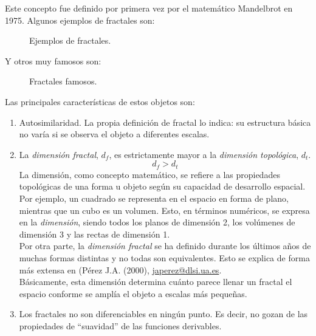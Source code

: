 \documentclass[a4paper, openright, 11pt, titlepage]{report}
\theoremstyle{definition}\newtheorem{defin}[propo]{Definition}
\theoremstyle{definition}\newtheorem{obser}[propo]{Remark}
\theoremstyle{definition}\newtheorem{ejem}[propo]{Ejemplo}
\theoremstyle{definition}\newtheorem{algoritmo}[propo]{Algoritmo}
\begin{document}
\begin{itemize}
    Este concepto fue definido por primera vez por el matemático Mandelbrot en 1975. Algunos ejemplos de fractales son:
    \begin{figure}[H]
        \centering
         \hspace{1.7cm}
        \caption{Ejemplos de fractales.}
    \end{figure}
    Y otros muy famosos son:
    \begin{figure}[H]
        \centering
         \hspace{1.7cm}
        \caption{Fractales famosos.}
    \end{figure}
    Las principales características de estos objetos son:
    \begin{enumerate}
        \item Autosimilaridad. La propia definición de fractal lo indica: su estructura básica no varía si se observa el objeto a diferentes escalas.
        \item La \textit{dimensión fractal}, $d_{f}$, es estrictamente mayor a la \textit{dimensión topológica}, $d_{t}$.
        $$d_{f} > d_{t}$$
        La dimensión, como concepto matemático, se refiere a las propiedades topológicas de una forma u objeto según su capacidad de desarrollo espacial. Por ejemplo, un cuadrado se representa en el espacio en forma de plano, mientras que un cubo es un volumen. Esto, en términos numéricos, se expresa en la \textit{dimensión}, siendo todos los planos de dimensión 2, los volúmenes de dimensión 3 y las rectas de dimensión 1.\\
        Por otra parte, la \textit{dimensión fractal} se ha definido durante los últimos años de muchas formas distintas y no todas son equivalentes. Esto se explica de forma más extensa en \cite{fractales} ({Pérez J.A.} (2000), \url{japerez@dlsi.ua.es}.\\
        Básicamente, esta dimensión determina cuánto parece llenar un fractal el espacio conforme se amplía el objeto a escalas más pequeñas.
        \item Los fractales no son diferenciables en ningún punto. Es decir, no gozan de las propiedades de “suavidad” de las funciones derivables.\\

\end{enumerate}
\end{itemize}
\end{document}
